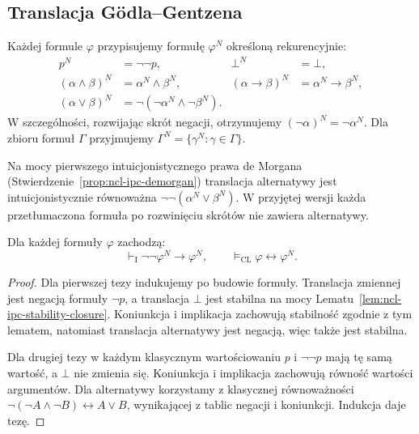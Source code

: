 \subsection{Translacja Gödla--Gentzena}

\begin{definicja}
\label{def:ncl-ipc-negative-translation}
Każdej formule $\varphi$ przypisujemy formułę
$\varphi^N$ określoną rekurencyjnie:
\[
\begin{aligned}
 p^N&=\neg\neg p, & \bot^N&=\bot,\\
 (\alpha\wedge\beta)^N&=\alpha^N\wedge\beta^N,&
 (\alpha\to\beta)^N&=\alpha^N\to\beta^N,\\
 (\alpha\vee\beta)^N&=\neg(\neg\alpha^N\wedge
                                      \neg\beta^N).
\end{aligned}
\]
W szczególności, rozwijając skrót negacji,
otrzymujemy $(\neg\alpha)^N=\neg\alpha^N$.
Dla zbioru formuł $\Gamma$ przyjmujemy
$\Gamma^N=\{\gamma^N:\gamma\in\Gamma\}$.
\end{definicja}
Na mocy pierwszego intuicjonistycznego prawa
de Morgana (Stwierdzenie~\ref{prop:ncl-ipc-demorgan})
translacja alternatywy jest intuicjonistycznie
równoważna $\neg\neg(\alpha^N\vee\beta^N)$.
W przyjętej wersji każda przetłumaczona formuła
po rozwinięciu skrótów nie zawiera alternatywy.

\begin{lemat}
\label{lem:ncl-ipc-negative-stability}
Dla każdej formuły $\varphi$ zachodzą:
\[
 \vdash_{\mathrm I}\neg\neg\varphi^N\to\varphi^N,
 \qquad
 \models_{\mathrm{CL}}\varphi\leftrightarrow\varphi^N.
\]
\end{lemat}
\begin{proof}
Dla pierwszej tezy indukujemy po budowie formuły.
Translacja zmiennej jest negacją formuły $\neg p$,
a translacja $\bot$ jest stabilna na mocy
Lematu~\ref{lem:ncl-ipc-stability-closure}.
Koniunkcja i implikacja zachowują stabilność
zgodnie z tym lematem, natomiast translacja
alternatywy jest negacją, więc także jest stabilna.

Dla drugiej tezy w każdym klasycznym wartościowaniu
$p$ i $\neg\neg p$ mają tę samą wartość, a $\bot$
nie zmienia się. Koniunkcja i implikacja zachowują
równość wartości argumentów. Dla alternatywy
korzystamy z klasycznej równoważności
$\neg(\neg A\wedge\neg B)\leftrightarrow A\vee B$,
wynikającej z tablic negacji i koniunkcji.
Indukcja daje tezę.
\end{proof}

